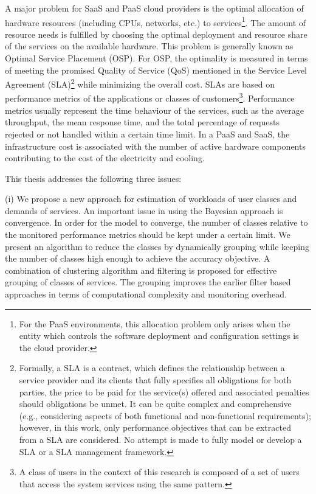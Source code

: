 A major problem for SaaS and PaaS cloud providers is the optimal allocation of hardware resources (including CPUs, networks, etc.) to services\footnote{For the PaaS environments, this allocation problem only arises when the entity which controls the software deployment and configuration settings is the cloud provider.}. The amount of resource needs is fulfilled by choosing the optimal deployment and resource share of the services on the available hardware. This problem is generally known as Optimal Service Placement (OSP)\cite{zhang2012dynamicPlacement}. 
   For OSP, the optimality is measured in terms of meeting the promised Quality of Service (QoS) mentioned in the Service Level Agreement (SLA)\footnote{Formally, a SLA is a contract, which defines the relationship between a service provider and its clients that fully specifies all obligations for both parties, the price to be paid for the service(s) offered and associated penalties should obligations be unmet. It can be quite complex and comprehensive (e.g., considering aspects of both functional and non-functional requirements); however, in this work, only performance objectives that can be extracted from a SLA are considered. No attempt is made to fully model or develop a SLA or a SLA management framework.} while minimizing the overall cost. SLAs are based on performance metrics of the applications or classes of customers\footnote{A class of users in the context of this research is composed of a set of users that access the system services using the same pattern.}.
	Performance metrics usually represent the time behaviour of the services, such as the average throughput, the mean response time, and the total percentage of requests rejected or not handled within a certain time limit. 
	In a PaaS and SaaS, the infrastructure cost is associated with the number of active hardware components contributing to the cost of the electricity and cooling. 

 This thesis addresses the following three issues:   
  
 (i) We propose a new approach for estimation of workloads of user classes and demands of services. An important issue in using the Bayesian approach is convergence.  In order for the model to converge, the number of classes relative to the monitored performance metrics should be kept under a certain limit. We present an algorithm to reduce the  classes by dynamically grouping while keeping the number of classes high enough to achieve the accuracy objective. A combination of clustering algorithm and filtering is proposed for effective grouping of classes of services. The grouping improves the earlier filter based approaches in terms of computational complexity and monitoring overhead. %
       
